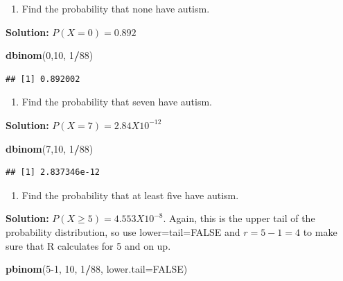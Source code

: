 \documentclass[
]{book}
\newenvironment{Shaded}{\begin{snugshade}}{\end{snugshade}}
\newcommand{\DataTypeTok}[1]{\textcolor[rgb]{0.13,0.29,0.53}{#1}}
\newcommand{\DecValTok}[1]{\textcolor[rgb]{0.00,0.00,0.81}{#1}}
\newcommand{\KeywordTok}[1]{\textcolor[rgb]{0.13,0.29,0.53}{\textbf{#1}}}
\newcommand{\NormalTok}[1]{#1}
\newcommand{\OperatorTok}[1]{\textcolor[rgb]{0.81,0.36,0.00}{\textbf{#1}}}
\newcommand{\OtherTok}[1]{\textcolor[rgb]{0.56,0.35,0.01}{#1}}
\providecommand{\tightlist}{%
  \setlength{\itemsep}{0pt}\setlength{\parskip}{0pt}}
\begin{document}
\begin{enumerate}
\def\labelenumi{\alph{enumi}.}
\setcounter{enumi}{2}
\tightlist
\item
  Find the probability that none have autism.
\end{enumerate}

\textbf{Solution:}
\(P(X=0)=0.892\)

\begin{Shaded}
\begin{Highlighting}[]
\KeywordTok{dbinom}\NormalTok{(}\DecValTok{0}\NormalTok{,}\DecValTok{10}\NormalTok{, }\DecValTok{1}\OperatorTok{/}\DecValTok{88}\NormalTok{)}
\end{Highlighting}
\end{Shaded}

\begin{verbatim}
## [1] 0.892002
\end{verbatim}

\begin{enumerate}
\def\labelenumi{\alph{enumi}.}
\setcounter{enumi}{3}
\tightlist
\item
  Find the probability that seven have autism.
\end{enumerate}

\textbf{Solution:}
\(P(X=7)=2.84X10^{-12}\)

\begin{Shaded}
\begin{Highlighting}[]
\KeywordTok{dbinom}\NormalTok{(}\DecValTok{7}\NormalTok{,}\DecValTok{10}\NormalTok{, }\DecValTok{1}\OperatorTok{/}\DecValTok{88}\NormalTok{)}
\end{Highlighting}
\end{Shaded}

\begin{verbatim}
## [1] 2.837346e-12
\end{verbatim}

\begin{enumerate}
\def\labelenumi{\alph{enumi}.}
\setcounter{enumi}{4}
\tightlist
\item
  Find the probability that at least five have autism.
\end{enumerate}

\textbf{Solution:}
\(P(X \ge 5)=4.553X10^{-8}\). Again, this is the upper tail of the probability distribution, so use lower=tail=FALSE and \(r=5-1=4\) to make sure that R calculates for 5 and on up.

\begin{Shaded}
\begin{Highlighting}[]
\KeywordTok{pbinom}\NormalTok{(}\DecValTok{5-1}\NormalTok{, }\DecValTok{10}\NormalTok{, }\DecValTok{1}\OperatorTok{/}\DecValTok{88}\NormalTok{, }\DataTypeTok{lower.tail=}\OtherTok{FALSE}\NormalTok{)}
\end{Highlighting}
\end{Shaded}
\end{document}

